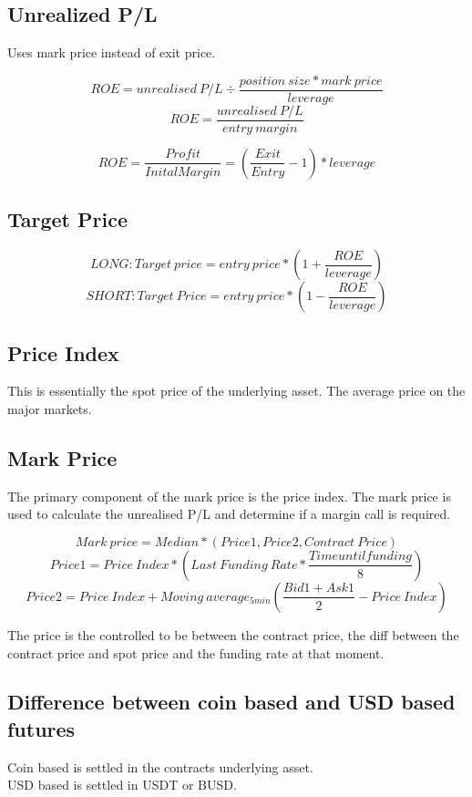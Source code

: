 \documentclass[11pt]{scrartcl} %
\begin{document}
\subsection{Unrealized P/L}

Uses mark price instead of exit price. 

\[ ROE = unrealised\:P/L \div \frac{position\:size * mark\:price}{leverage} \]
\[ ROE = \frac{unrealised\:P/L}{entry\:margin} \] 


\[ ROE = \frac{Profit}{Inital Margin} = (\frac{Exit}{Entry} - 1) * leverage \]

\subsection{Target Price}

\[ LONG: Target\:price = entry\:price*(1+ \frac{ROE}{leverage}) \]
\[ SHORT: Target\:Price = entry\:price * (1-\frac{ROE}{leverage}) \]

\subsection{Price Index}

This is essentially the spot price of the underlying asset. The average price on the major markets.

\subsection{Mark Price}

The primary component of the mark price is the price index. The mark price is used to calculate the
unrealised P/L and determine if a margin call is required.

\[ Mark\:price = Median*(Price1,Price2,Contract\:Price) \]
\[ Price1 = Price\:Index * (Last\:Funding\:Rate*\frac{Time until funding}{8}) \]
\[ Price2 = Price\:Index + Moving\:average_{5min}(\frac{Bid1+Ask1}{2} - Price\:Index) \]

The price is the controlled to be between the contract price, the diff between the contract price and
spot price and the funding rate at that moment.

\subsection{Difference between coin based and USD based futures}

Coin based is settled in the contracts underlying asset.\\
USD based is settled in USDT or BUSD.
\end{document}
